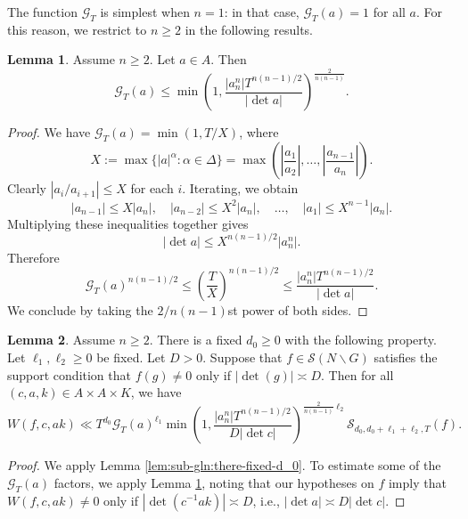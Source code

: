 \documentclass[reqno]{amsart}
\theoremstyle{plain} \newtheorem{theorem} {Theorem}
\theoremstyle{definition} \newtheorem{definition} [theorem] {Definition}
\theoremstyle{itplain} %
\newtheorem{lemma}[theorem]{Lemma}
\numberwithin{equation}{section}
\numberwithin{theorem}{section}
\renewcommand{\geq}{\geqslant}
\renewcommand{\leq}{\leqslant}
\begin{document}
The function $\mathcal{G}_T$ is simplest when $n=1$: in that case, $\mathcal{G}_T(a) = 1$ for all $a$.  For this reason, we restrict to $n \geq 2$ in the following results.
\begin{lemma}\label{lem:sub-gln:let-a-in}
  Assume $n \geq 2$.
  Let $a \in A$.  Then
  \begin{equation*}
    \mathcal{G}_T(a) \leq
    \min \left( 1,
      \frac{|a_n^n| T^{n(n-1)/2}}{ |\det a|}
    \right)^{ \frac{2}{n(n-1)} }.
  \end{equation*}
\end{lemma}
\begin{proof}
  We have $\mathcal{G}_T(a) = \min(1,T/X)$, where
  \begin{equation*}
    X := \max \{|a|^\alpha : \alpha \in \Delta \}
    = \max \left( \left\lvert \frac{a_1}{a_2} \right\rvert, \dotsc, \left\lvert \frac{a_{n-1}}{a_{n}} \right\rvert \right).
  \end{equation*}
  Clearly $|a_i / a_{i+1}| \leq X$ for each $i$.  Iterating, we obtain
  \begin{equation*}
    |a_{n-1}| \leq X |a_n|,
    \quad
    |a_{n-2}| \leq X^2 |a_{n}|,
    \quad
    \dotsc,
    \quad
    |a_1| \leq X^{n-1} |a_n|.
  \end{equation*}
  Multiplying these inequalities together gives
  \begin{equation*}
    |\det a| \leq X^{n(n-1)/2} |a_n^n|.
  \end{equation*}
  Therefore
  \begin{equation*}
    \mathcal{G}_T(a)^{n(n-1)/2}
    \leq \left( \frac{T}{X} \right)^{n(n-1)/2}
    \leq
    \frac{|a_n^n| T^{n(n-1)/2} }{|\det a|}.
  \end{equation*}
  We conclude by taking the $2/n(n-1)$st power of both sides.
\end{proof}



\begin{lemma}\label{lem:sub-gln:there-fixed-d_0-1}
  Assume $n \geq 2$.
  There is a fixed $d_0 \geq 0$ with the following property.  Let $\ell_1, \ell_2 \geq 0$ be fixed.  Let $D > 0$.  Suppose that $f \in \mathcal{S}(N \backslash G)$ satisfies the support condition that $f(g) \neq 0$ only if $|\det(g)| \asymp D$.  Then for all $(c,a,k) \in A \times A \times K$, we have
\begin{equation}\label{eq:wf-c-k-3}
  W(f,c,a k) \ll
  T^{d_0}
  \mathcal{G}_T(a)^{\ell_1}
  \min \left( 1,
    \frac{|a_n^n| T^{n(n-1)/2}}{D |\det c|}
  \right)^{\frac{2}{n(n-1)} \ell_2 }
  \mathcal{S}_{d_0, d_0+ \ell_1 + \ell_2, T}(f).
\end{equation}
\end{lemma}
\begin{proof}
  We apply Lemma \ref{lem:sub-gln:there-fixed-d_0}.  To estimate some of the $\mathcal{G}_T(a)$ factors, we apply Lemma \ref{lem:sub-gln:let-a-in}, noting that our hypotheses on $f$ imply that $W(f,c,a k) \neq 0$ only if $|\det(c^{-1} a k)| \asymp D$, i.e., $|\det a| \asymp D |\det c|$.
\end{proof}
\end{document}
